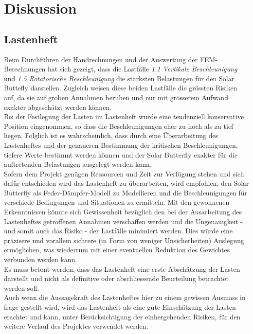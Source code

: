 \section{Diskussion}
\label{Diskussion}

\subsection{Lastenheft}
Beim Durchführen der Handrechnungen und der Auswertung der FEM-Berechnungen hat sich gezeigt, dass die Lastfälle \emph{1.1 Vertikale Beschleunigung} und \emph{1.5 Rotatorische Beschleunigung} die stärksten Belastungen für den Solar Buttefly darstellen. Zugleich weisen diese beiden Lastfälle die grössten Risiken auf, da sie auf groben Annahmen beruhen und nur mit grösserem Aufwand exakter abgeschätzt werden können.\\
Bei der Festlegung der Lasten im Lastenheft wurde eine tendenziell konservative Position eingenommen, so dass die Beschleunigungen eher zu hoch als zu tief liegen. Folglich ist es wahrscheinlich, dass durch eine Überarbeitung des Lastenheftes und der genaueren Bestimmung der kritischen Beschleunigungen, tiefere Werte bestimmt werden können und der Solar Butterfly exakter für die auftretenden Belastungen ausgelegt werden kann.\\
Sofern dem Projekt genügen Ressourcen und Zeit zur Verfügung stehen und sich dafür entschieden wird das Lastenheft zu überarbeiten, wird empfohlen, den Solar Butterfly als Feder-Dämpfer-Modell zu Modellieren und die Beschleunigungen für verschiede Bedingungen und Situationen zu ermitteln. Mit den gewonnenen Erkenntnissen könnte sich Gewissenheit bezüglich den bei der Ausarbeitung des Lastenheftes getroffenen Annahmen verschaffen werden und die Ungenauigkeit - und somit auch das Risiko - der Lastfälle minimiert werden. Dies würde eine präzisere und vorallem sichrere (in Form von weniger Unsicherheiten) Auslegung ermöglichen, was wiederrum mit einer eventuellen Reduktion des Gewichtes verbunden werden kann.\\
Es muss betont werden, dass das Lastenheft eine erste Abschätzung der Lasten darstellt und nicht als definitive oder abschliessende Beurteilung betrachtet werden soll.\\
Auch wenn die Aussagekraft des Lastenheftes hier zu einem gewissen Ausmass in frage gestellt wird, wird das Lastenheft als eine gute Einschätzung der Lasten erachtet und kann, unter Berücksichtigung der einhergehenden Risiken, für den weitere Verlauf des Projektes verwendet werden.

